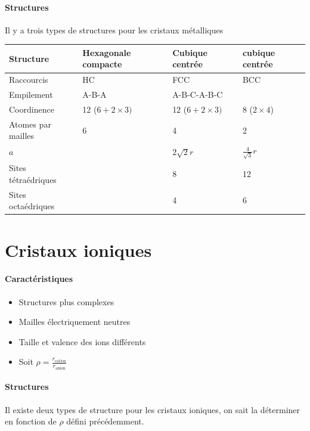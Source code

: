 \documentclass[11pt,a4paper,french]{article}
\begin{document}
\paragraph{Structures}
Il y a trois types de structures pour les cristaux métalliques
\begin{center}
	\begin{tabular}{|p{2cm}|l|l|l|}
		\hline
		Structure & Hexagonale compacte & Cubique centrée & cubique centrée\\
		\hline
		Raccourcis & HC & FCC & BCC\\
		\hline
		Empilement & A-B-A & A-B-C-A-B-C\\
		\hline
		Coordinence & 12 ($6 + 2\times3)$ & 12 ($6 + 2\times3)$ & 8 ($2 \times 4$)\\
		\hline
		Atomes par mailles & 6 & 4 & 2\\
		\hline
		$a$ & & $2\sqrt{2}r$ & $\frac{4}{\sqrt{3}}r$\\
		\hline
		Sites tétraédriques & & 8 & 12\\
		\hline
		Sites octaédriques & & 4 & 6\\
		\hline
	\end{tabular}
\end{center}

\section{Cristaux ioniques}

\paragraph{Caractéristiques}
\begin{itemize}
	\item Structures plus complexes
	\item Mailles électriquement neutres
	\item Taille et valence des ions différents
	\item Soit $\rho = \frac{r_\mathrm{cation}}{r_\mathrm{anion}}$
\end{itemize}

\paragraph{Structures}
Il existe deux types de structure pour les cristaux ioniques, on sait la déterminer en fonction de $\rho$ défini précédemment.
\end{document}
